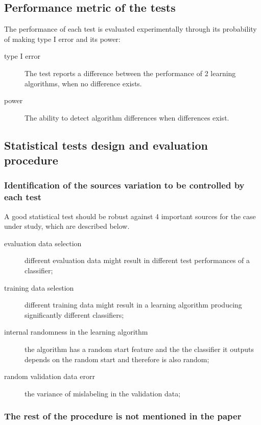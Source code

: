\documentclass[12pt]{article}
\begin{document}
\subsection{Performance metric of the tests}
The performance of each test is evaluated experimentally through its probability of making type I error and its power:
\begin{description}
\item[type I error] The test reports a difference between the performance of 2 learning algorithms, when no difference exists.
\item[power] The ability to detect algorithm differences when differences exist.
\end{description}
\subsection{Statistical tests design and evaluation procedure}
\subsubsection{Identification of the sources variation to be controlled by each test}
A good statistical test should be robust against 4 important sources for the case under study, which are described below.
\begin{description}
  \item[evaluation data selection] different evaluation data might result in different test performances of a classifier;
  \item[training data selestion] different training data might result in a learning algorithm producing significantly different classifiers;
  \item[internal randomness in the learning algorithm] the algorithm has a random start feature and the the classifier it outputs depends on the random start and therefore is also random;
  \item[random validation data erorr] the variance of mislabeling in the validation data;
\end{description}
\subsubsection{The rest of the procedure is not mentioned in the paper}
\end{document}
